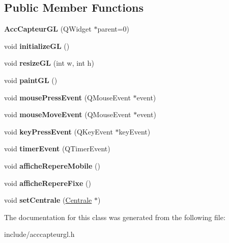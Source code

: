 \subsection*{Public Member Functions}
\begin{DoxyCompactItemize}
\item 
\hypertarget{class_acc_capteur_g_l_a8da052a07d083c8d7ddff4c85b0b7df6}{{\bfseries Acc\-Capteur\-G\-L} (Q\-Widget $\ast$parent=0)}\label{class_acc_capteur_g_l_a8da052a07d083c8d7ddff4c85b0b7df6}

\item 
\hypertarget{class_acc_capteur_g_l_a740d6c4ef458b3c1d61562c5c780cbb0}{void {\bfseries initialize\-G\-L} ()}\label{class_acc_capteur_g_l_a740d6c4ef458b3c1d61562c5c780cbb0}

\item 
\hypertarget{class_acc_capteur_g_l_a864e5cc3409a7ee6efd96991ec062ba6}{void {\bfseries resize\-G\-L} (int w, int h)}\label{class_acc_capteur_g_l_a864e5cc3409a7ee6efd96991ec062ba6}

\item 
\hypertarget{class_acc_capteur_g_l_a90791e517cb80816e73ba97a13637f04}{void {\bfseries paint\-G\-L} ()}\label{class_acc_capteur_g_l_a90791e517cb80816e73ba97a13637f04}

\item 
\hypertarget{class_acc_capteur_g_l_aece5e7953f65bbe2a416295eec3553bb}{void {\bfseries mouse\-Press\-Event} (Q\-Mouse\-Event $\ast$event)}\label{class_acc_capteur_g_l_aece5e7953f65bbe2a416295eec3553bb}

\item 
\hypertarget{class_acc_capteur_g_l_ad86f320e4c7d2c22e426ff5f015ce3fa}{void {\bfseries mouse\-Move\-Event} (Q\-Mouse\-Event $\ast$event)}\label{class_acc_capteur_g_l_ad86f320e4c7d2c22e426ff5f015ce3fa}

\item 
\hypertarget{class_acc_capteur_g_l_af599ec8a2e7044b805877d7dcb5ffe72}{void {\bfseries key\-Press\-Event} (Q\-Key\-Event $\ast$key\-Event)}\label{class_acc_capteur_g_l_af599ec8a2e7044b805877d7dcb5ffe72}

\item 
\hypertarget{class_acc_capteur_g_l_a50e835ae8080571cdf416915e091adda}{void {\bfseries timer\-Event} (Q\-Timer\-Event)}\label{class_acc_capteur_g_l_a50e835ae8080571cdf416915e091adda}

\item 
\hypertarget{class_acc_capteur_g_l_a528a84ba67c9e52dcc62b3fe1f85274a}{void {\bfseries affiche\-Repere\-Mobile} ()}\label{class_acc_capteur_g_l_a528a84ba67c9e52dcc62b3fe1f85274a}

\item 
\hypertarget{class_acc_capteur_g_l_a70ed691cf790bbc308e0b01cbf5a8e61}{void {\bfseries affiche\-Repere\-Fixe} ()}\label{class_acc_capteur_g_l_a70ed691cf790bbc308e0b01cbf5a8e61}

\item 
\hypertarget{class_acc_capteur_g_l_a04569ff091de8fc054d72daf1108d416}{void {\bfseries set\-Centrale} (\hyperlink{class_centrale}{Centrale} $\ast$)}\label{class_acc_capteur_g_l_a04569ff091de8fc054d72daf1108d416}

\end{DoxyCompactItemize}


The documentation for this class was generated from the following file\-:\begin{DoxyCompactItemize}
\item 
include/acccapteurgl.\-h\end{DoxyCompactItemize}
